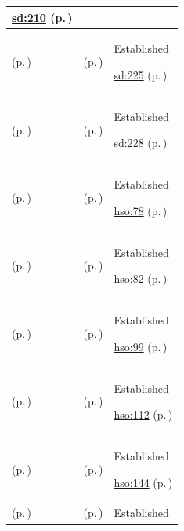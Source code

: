 \begin{longtable}{|>{\raggedright\arraybackslash}p{0.27\TableWidth}|>{\raggedright\arraybackslash}p{0.27\TableWidth}|>{\raggedright\arraybackslash}p{0.46\TableWidth}|}
 \hyperref[rad:sd:202]{sd:210} (p.\,\pageref{rad:sd:202})\\\hline
\nameref{function:correlate-virtual-care-consultation-context} (p.\,\pageref{function:correlate-virtual-care-consultation-context}) & \nameref{feature:feat-sd-20} (p.\,\pageref{feature:feat-sd-20}) & Established

 \hyperref[rad:sd:221]{sd:225} (p.\,\pageref{rad:sd:221})\\\hline
\nameref{function:ingest-remote-patient-telemetry} (p.\,\pageref{function:ingest-remote-patient-telemetry}) & \nameref{feature:feat-sd-19} (p.\,\pageref{feature:feat-sd-19}) & Established

 \hyperref[rad:sd:221]{sd:228} (p.\,\pageref{rad:sd:221})\\\hline
\nameref{function:track-clinic-operating-session} (p.\,\pageref{function:track-clinic-operating-session}) & \nameref{feature:feat-hso-01} (p.\,\pageref{feature:feat-hso-01}) & Established

 \hyperref[rad:hso:72]{hso:78} (p.\,\pageref{rad:hso:72})\\\hline
\nameref{function:manage-clinic-queue-progression} (p.\,\pageref{function:manage-clinic-queue-progression}) & \nameref{feature:feat-hso-02} (p.\,\pageref{feature:feat-hso-02}) & Established

 \hyperref[rad:hso:72]{hso:82} (p.\,\pageref{rad:hso:72})\\\hline
\nameref{function:assemble-ward-handover-context} (p.\,\pageref{function:assemble-ward-handover-context}) & \nameref{feature:feat-hso-04} (p.\,\pageref{feature:feat-hso-04}) & Established

 \hyperref[rad:hso:90]{hso:99} (p.\,\pageref{rad:hso:90})\\\hline
\nameref{function:manage-theatre-case-progression} (p.\,\pageref{function:manage-theatre-case-progression}) & \nameref{feature:feat-hso-05} (p.\,\pageref{feature:feat-hso-05}) & Established

 \hyperref[rad:hso:106]{hso:112} (p.\,\pageref{rad:hso:106})\\\hline
\nameref{function:capture-post-clinic-follow-up-requirements} (p.\,\pageref{function:capture-post-clinic-follow-up-requirements}) & \nameref{feature:feat-hso-10} (p.\,\pageref{feature:feat-hso-10}) & Established

 \hyperref[rad:hso:134]{hso:144} (p.\,\pageref{rad:hso:134})\\\hline
\nameref{function:maintain-operational-bed-state} (p.\,\pageref{function:maintain-operational-bed-state}) & \nameref{feature:feat-hso-11} (p.\,\pageref{feature:feat-hso-11}) & Established


\end{longtable}
